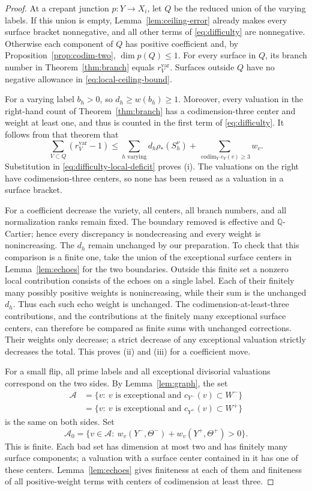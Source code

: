 \begin{proof}
At a crepant junction \(p:Y\to X_i\), let \(Q\) be the reduced
union of the varying labels.  If this union is empty,
Lemma~\ref{lem:ceiling-error} already makes every surface bracket
nonnegative, and all other terms of \eqref{eq:difficulty} are
nonnegative.  Otherwise each component of \(Q\) has positive
coefficient and, by Proposition~\ref{prop:codim-two},
\(\dim p(Q)\leq1\).  For every surface in \(Q\), its branch
number in Theorem~\ref{thm:branch} equals
\(r_V^{\mathrm{var}}\).  Surfaces outside \(Q\) have no negative
allowance in \eqref{eq:local-ceiling-bound}.

For a varying label \(b_h>0\), so \(d_h\geq w(b_h)\geq1\).
Moreover, every valuation in the right-hand count of
Theorem~\ref{thm:branch} has a codimension-three center and weight
at least one, and thus is counted in the first term of
\eqref{eq:difficulty}.  It follows from that theorem that
\[
 \sum_{V\subset Q}(r_V^{\mathrm{var}}-1)
 \leq
 \sum_{h\text{ varying}}d_h\rho_*(S_h^\nu)
 +\sum_{\operatorname{codim}_Y c_Y(v)\geq3}w_v.
\]
Substitution in \eqref{eq:difficulty-local-deficit} proves (i).
The valuations on the right have codimension-three centers, so none
has been reused as a valuation in a surface bracket.

For a coefficient decrease the variety, all centers, all branch
numbers, and all normalization ranks remain fixed.  The boundary
removed is effective and \(\mathbb Q\)-Cartier; hence every
discrepancy is nondecreasing and every weight is nonincreasing.
The \(d_h\) remain unchanged by our preparation.  To check that
this comparison is a finite one, take the union of the exceptional
surface centers in Lemma~\ref{lem:echoes} for the two boundaries.
Outside this finite set a nonzero local contribution consists of
the echoes on a single label.  Each of their finitely many possibly
positive weights is nonincreasing, while their sum is the unchanged
\(d_h\).  Thus each such echo weight is unchanged.  The
codimension-at-least-three contributions, and the contributions at
the finitely many exceptional surface centers, can therefore be
compared as finite sums with unchanged corrections.  Their weights
only decrease; a strict decrease of any exceptional valuation
strictly decreases the total.  This proves (ii) and (iii) for a
coefficient move.

For a small flip, all prime labels and all exceptional divisorial
valuations correspond on the two sides.  By
Lemma~\ref{lem:graph}, the set
\[
\begin{split}
 \mathcal A
 &=\{v:\ v\text{ is exceptional and }c_{Y^-}(v)\subset W^-\}\\
 &=\{v:\ v\text{ is exceptional and }c_{Y^+}(v)\subset W^+\}
\end{split}
\]
is the same on both sides.  Set
\[
 \mathcal A_0=
 \{v\in\mathcal A:\ w_v(Y^-,\Theta^-)+w_v(Y^+,\Theta^+)>0\}.
\]
This is finite.  Each bad set has dimension at most two and has
finitely many surface components; a valuation with a surface center
contained in it has one of these centers.  Lemma~\ref{lem:echoes}
gives finiteness at each of them and finiteness of all positive-weight
terms with centers of codimension at least three.


\end{proof}
